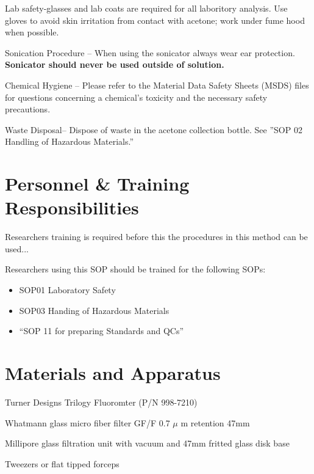 \documentclass[12pt]{../SOP3}\usepackage[]{graphicx}\usepackage[]{color}
\begin{document}
\NP Lab safety-glasses and lab coats are required for all laboritory analysis. Use gloves to avoid skin irritation from contact with acetone; work under fume hood when possible. 

\NP Sonication Procedure -- When using the sonicator always wear ear protection. \textbf {Sonicator should never be used outside of solution.}

\NP Chemical Hygiene -- Please refer to the Material Data Safety Sheets (MSDS) files for questions concerning a chemical's toxicity and the necessary safety precautions.

\NP Waste Disposal-- Dispose of waste in the acetone collection bottle. See ''SOP 02 Handling of Hazardous Materials.'' %

\section{Personnel \& Training Responsibilities}

\NP Researchers training is required before this the procedures in this method can be used... 

\NP Researchers using this SOP should be trained for the following SOPs:

\begin{itemize}
  \item SOP01 Laboratory Safety
  \item SOP03 Handing of Hazardous Materials
\item ``SOP 11 for preparing Standards and QCs'' %
\end{itemize}

\section{Materials and Apparatus}

\NP Turner Designs Trilogy Fluoromter (P/N 998-7210)

\NP Whatmann glass micro fiber filter GF/F 0.7 $\mu$  m retention 47mm 

\NP Millipore glass filtration unit with vacuum and 47mm fritted glass disk base 

\NP Tweezers or flat tipped forceps
\end{document}
